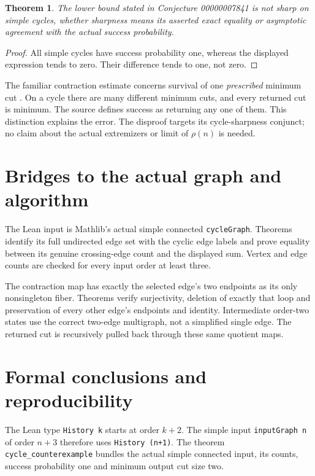 \documentclass[11pt]{article}
\newtheorem{theorem}{Theorem}
\begin{document}
\begin{theorem}
The lower bound stated in Conjecture 00000007841 is
not sharp on simple cycles, whether sharpness means
its asserted exact equality or asymptotic agreement
with the actual success probability.
\end{theorem}
\begin{proof}
All simple cycles have success probability one,
whereas the displayed expression tends to zero.
Their difference tends to one, not zero.
\end{proof}

The familiar contraction estimate concerns survival
of one \emph{prescribed} minimum cut
\cite[Theorem 2.1]{karger}. On a cycle there are many
different minimum cuts, and every returned cut is
minimum. The source defines success as returning any
one of them. This distinction explains the error.
The disproof targets its cycle-sharpness conjunct;
no claim about the actual extremizers or limit of
$\rho(n)$ is needed.

\section*{Bridges to the actual graph and algorithm}
The Lean input is Mathlib's actual simple connected
\texttt{cycleGraph}. Theorems identify its full
undirected edge set with the cyclic edge labels and
prove equality between its genuine crossing-edge count
and the displayed sum. Vertex and edge counts are
checked for every input order at least three.

The contraction map has exactly the selected edge's
two endpoints as its only nonsingleton fiber.
Theorems verify surjectivity, deletion of exactly that
loop and preservation of every other edge's endpoints
and identity. Intermediate order-two states use the
correct two-edge multigraph, not a simplified single
edge. The returned cut is recursively pulled back
through these same quotient maps.

\newpage
\section*{Formal conclusions and reproducibility}
The Lean type \texttt{History k} starts at order $k+2$.
The simple input \texttt{inputGraph n} of order $n+3$
therefore uses \texttt{History (n+1)}. The theorem
\texttt{cycle\_counterexample} bundles the actual
simple connected input, its counts, success probability
one and minimum output cut size two.
\end{document}
